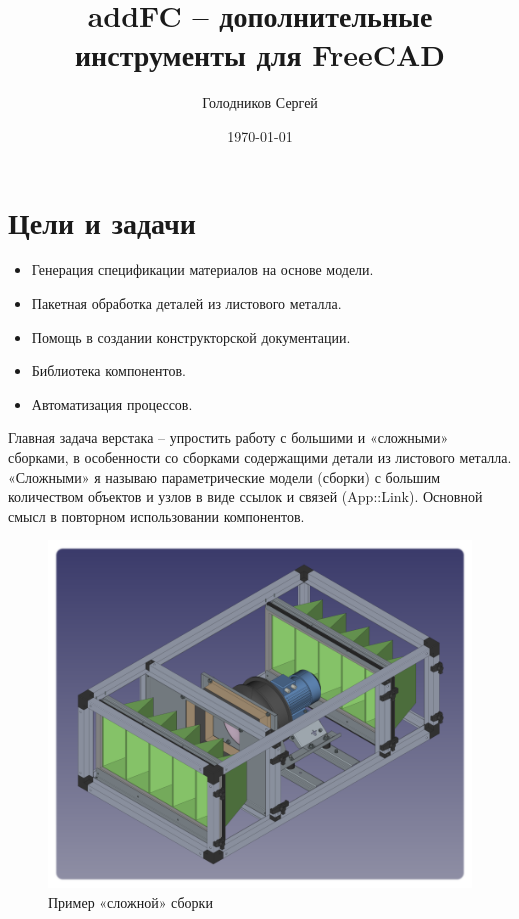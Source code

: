 \documentclass[a4paper,12pt]{article}
\title{addFC -- дополнительные инструменты для FreeCAD}
\author{Голодников Сергей}
\date{\today}
\begin{document}
\maketitle




\section{Цели и задачи}

\begin{itemize}
	\item Генерация спецификации материалов на основе модели.
	\item Пакетная обработка деталей из листового металла.
	\item Помощь в создании конструкторской документации.
	\item Библиотека компонентов.
	\item Автоматизация процессов.\\
\end{itemize}

Главная задача верстака -- упростить работу с большими и «сложными» сборками, в особенности со сборками содержащими детали из листового металла. «Сложными» я называю параметрические модели (сборки) с большим количеством объектов и узлов в виде ссылок и связей (App::Link). Основной смысл в повторном использовании компонентов.

\begin{figure}[htp]
	\centering
	\includegraphics[scale=0.46]{img/assembly_example.png}
	\caption{Пример «сложной» сборки}
	\label{sec:assembly_example}
\end{figure}
\end{document}
